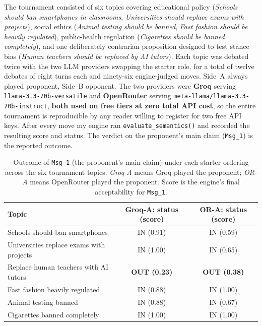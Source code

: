 The tournament consisted of six topics covering educational policy (\emph{Schools should ban smartphones in classrooms}, \emph{Universities should replace exams with projects}), social ethics (\emph{Animal testing should be banned}, \emph{Fast fashion should be heavily regulated}), public-health regulation (\emph{Cigarettes should be banned completely}), and one deliberately contrarian proposition designed to test stance bias (\emph{Human teachers should be replaced by AI tutors}). Each topic was debated twice with the two LLM providers swapping the starter role, for a total of twelve debates of eight turns each and ninety-six engine-judged moves. Side~A always played proponent, Side~B opponent. The two providers were \textbf{Groq} serving \texttt{llama-3.3-70b-versatile} \cite{groq2024api, meta2024llama3} and \textbf{OpenRouter} serving \texttt{meta-llama/llama-3.3-70b-instruct}, \textbf{both used on free tiers at zero total API cost}, so the entire tournament is reproducible by any reader willing to register for two free API keys. After every move my engine ran \texttt{evaluate\_semantics()} and recorded the resulting score and status. The verdict on the proponent's main claim (\texttt{Msg\_1}) is the reported outcome.

\begin{table}[ht]
\centering
\caption{Outcome of \texttt{Msg\_1} (the proponent's main claim) under each starter ordering across the six tournament topics. \emph{Groq-A} means Groq played the proponent; \emph{OR-A} means OpenRouter played the proponent. Score is the engine's final acceptability for \texttt{Msg\_1}.}
\label{tab:aivai_outcomes}
\begin{tabular}{lcc}
\toprule
Topic & Groq-A: status (score) & OR-A: status (score) \\
\midrule
Schools should ban smartphones                & IN (0.91) & IN (0.59) \\
Universities replace exams with projects      & IN (1.00) & IN (0.65) \\
Replace human teachers with AI tutors         & \textbf{OUT (0.23)} & \textbf{OUT (0.38)} \\
Fast fashion heavily regulated                & IN (0.88) & IN (1.00) \\
Animal testing banned                         & IN (0.88) & IN (0.67) \\
Cigarettes banned completely                  & IN (1.00) & IN (1.00) \\
\bottomrule
\end{tabular}
\end{table}

